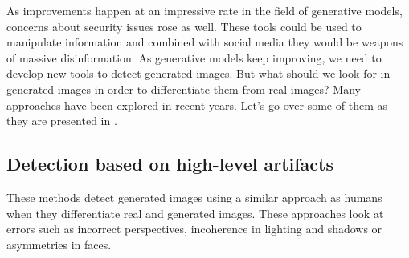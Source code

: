 \documentclass[12pt,a4paper]{article}
\begin{document}
As improvements happen at an impressive rate in the field of generative models, concerns about security issues rose as well. These tools could be used to manipulate information and combined with social media they would be weapons of massive disinformation. As generative models keep improving, we need to develop new tools to detect generated images. But what should we look for in generated images in order to differentiate them from real images? Many approaches have been explored in recent years. Let's go over some of them as they are presented in \autocite*{tariangSyntheticImageVerification2024}.

\subsection{Detection based on high-level artifacts}
These methods detect generated images using a similar approach as humans when they differentiate real and generated images. These approaches look at errors such as incorrect perspectives, incoherence in lighting and shadows or asymmetries in faces.
\end{document}
